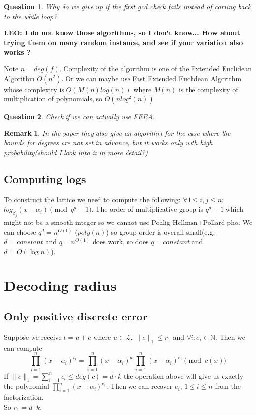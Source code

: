 \documentclass[12pt]{article}
\newtheorem{question}{Question}
\newtheorem{remark}{Remark}
\begin{document}
\begin{question}
Why do we give up if the first gcd check fails instead of coming back to the while loop?
\end{question}
{\bf LEO: I do not know those algorithms, so I don't know... How about trying them on many random instance, and see if your variation also works ?}


Note $n = deg(f)$.
Complexity of the algorithm is one of the Extended Euclidean Algorithm $O(n^2)$. Or we can maybe use Fast Extended Euclidean Algorithm whose complexity is $O(M(n)log(n))$ where $M(n)$ is the complexity of multiplication of polynomials, so $O(nlog^2(n))$
\begin{question}
Check if we can actually use FEEA.
\end{question}
\begin{remark}
In the paper they also give an algorithm for the case where the bounds for degrees are not set in advance, but it works only with high probability(should I look into it in more detail?)
\end{remark}
\subsection{Computing logs}

To construct the lattice we need to compute the following:
$\forall 1 \leq i,j \leq n :$ $log_{\beta_j}(x - \alpha_i) \pmod{q^{d} -1}$. The order of multiplicative group is $q^{d} - 1$ which might not be a smooth integer so we cannot use Pohlig-Hellman+Pollard pho. We can choose $q^{d} = n^{O(1)}$ ($poly(n)$) so group order is overall small(e.g. $d = constant$ and $q=n^{O(1)}$ does work, so does $q=constant$ and $d = O(\log n)$).

\section{Decoding radius}

\subsection{Only positive discrete error}
Suppose we receive $t = u + e$ where $u \in \mathcal{L}$, $\|e\|_1 \leq r_1$ and $\forall i: e_i \in \mathbb{N}$. Then we can compute
\[
\prod_{i = 1}^{n}(x - \alpha_i)^{t_i} = \prod_{i = 1}^{n}(x - \alpha_i)^{u_i}\prod_{i = 1}^{n}(x - \alpha_i)^{e_i} \pmod{c(x)}
\]
If $\|e\|_1 = \sum_{i =1}^{n} e_i \leq deg(c) = d \cdot k$ the operation above will give us exactly the polynomial $\prod_{i = 1}^{n}(x - \alpha_i)^{e_i}$. Then we can recover $e_i$, $1 \leq i \leq n$ from the factorization.\\
So $r_1 = d \cdot k$.
\end{document}
